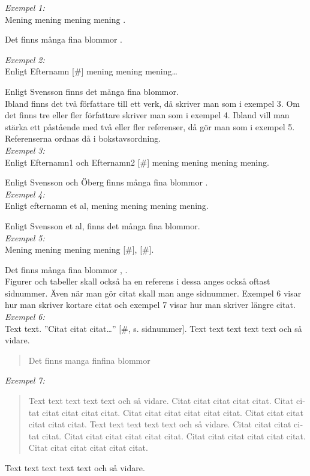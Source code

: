 \documentclass[a4paper,12pt]{article} %
\begin{document}
{\em Exempel 1:}\\
Mening mening mening mening \cite{sven01}. 

Det finns många fina blommor \cite{sven01}.

{\em Exempel 2:}\\
Enligt Efternamn [\#] mening mening mening…

Enligt Svensson \cite{sven01} finns det många fina blommor.\\

Ibland finns det två författare till ett verk, då skriver man som i exempel 3. Om det finns tre eller fler författare skriver man som i exempel 4. Ibland vill man stärka ett påstående med två eller fler referenser, då gör man som i exempel 5. Referenserna ordnas då i bokstavsordning. \\

{\em Exempel 3:}\\
Enligt Efternamn1 och Efternamn2 [\#] mening mening mening mening. 

Enligt Svensson och Öberg finns många fina blommor \cite{sven02}.\\

{\em Exempel 4:}\\
Enligt efternamn et al, \cite{Creswell2014} mening mening mening mening.

Enligt Svensson et al, \cite{sven07} finns det många fina blommor.\\

{\em Exempel 5:}\\ 
Mening mening mening mening [\#], [\#]. 

Det finns många fina blommor \cite{sven01}, \cite{sven02}.\\

Figurer och tabeller skall också ha en referens i dessa anges också oftast sidnummer. Även när man gör citat skall man ange sidnummer. Exempel 6 visar hur man skriver kortare citat och exempel 7 visar hur man skriver längre citat.\\

{\em Exempel 6:}\\ 
Text text. ”Citat citat citat…”  [\#, s. sidnummer]. Text text text text text och så vidare. 

\begin{quotation}
Det finns manga finfina blommor \cite[s. 23]{Creswell2014} \\
\end{quotation}

{\em Exempel 7:}
\hyphenblockcquote{swedish}[s. 1]{Creswell2014}{
Text text text text text och så vidare. Citat citat citat citat citat. Citat citat citat citat citat citat. Citat citat citat citat citat citat. Citat citat citat citat citat citat. Text text text text text och så vidare. Citat citat citat citat citat. Citat citat citat citat citat citat. Citat citat citat citat citat citat. Citat citat citat citat citat citat.}
Text text text text text och så vidare. \\
\end{document}

